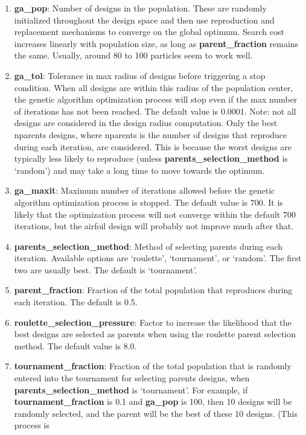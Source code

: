 \documentclass[11pt]{article}
\begin{document}
\begin{enumerate}
\item{\textbf{ga\_pop}: Number of designs in the population.  These are randomly
initialized throughout the design space and then use reproduction and replacement
mechanisms to converge on the global optimum.  Search cost increases linearly with
population size, as long as \textbf{parent\_fraction} remains the same.  Usually, around
80 to 100 particles seem to work well.}
\item{\textbf{ga\_tol}: Tolerance in max radius of designs before triggering a stop
condition.  When all designs are within this radius of the population center, the
genetic algorithm optimization process will stop even if the max number of iterations has
not been reached.  The default value is 0.0001. Note: not all designs are considered in
the design radius computation.  Only the best nparents designs, where nparents is the
number of designs that reproduce during each iteration, are considered.  This is because
the worst designs are typically less likely to reproduce (unless
\textbf{parents\_selection\_method} is `random') and may take a long time to move
towards the optimum.}
\item{\textbf{ga\_maxit}: Maximum number of iterations allowed before the genetic
algorithm optimization process is stopped.  The default value is 700.  It is likely that
the optimization process will not converge within the default 700 iterations, but the
airfoil design will probably not improve much after that.}
\item{\textbf{parents\_selection\_method}: Method of selecting parents during each
iteration.  Available options are `roulette', `tournament', or `random'.  The first two
are usually best.  The default is `tournament'.}
\item{\textbf{parent\_fraction}: Fraction of the total population that reproduces during
each iteration. The default is 0.5.}
\item{\textbf{roulette\_selection\_pressure}: Factor to increase the likelihood that the
best designs are selected as parents when using the roulette parent selection method.  The
default value is 8.0.}
\item{\textbf{tournament\_fraction}: Fraction of the total population that is randomly
entered into the tournament for selecting parents designs, when
\textbf{parents\_selection\_method} is `tournament'.  For example, if
\textbf{tournament\_fraction} is 0.1 and \textbf{ga\_pop} is 100, then 10 designs will be
randomly selected, and the parent will be the best of these 10 designs.  (This process is
}
\end{enumerate}
\end{document}
